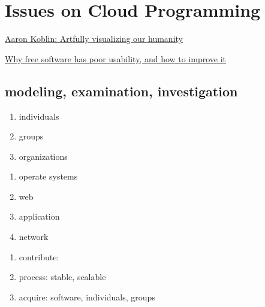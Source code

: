 \documentclass[draftclsnofoot,journal,onecolumn,12pt]{IEEEtran}
\begin{document}
\section{Issues on Cloud Programming}

\href{http://www.ted.com/talks/aaron_koblin.html}{Aaron Koblin: Artfully visualizing our humanity}

\href{http://www.mpt.net.nz/2012/06/why-free-software-has-poor-usability/}{Why free software has poor usability, and how to improve it}

\subsection{modeling, examination, investigation}

\begin{enumerate}
  \item individuals
  \item groups
  \item organizations
\end{enumerate}

\begin{enumerate}
  \item operate systems
  \item web
  \item application
  \item network
\end{enumerate}

\begin{enumerate}
  \item contribute:
  \item process: stable, scalable
  \item acquire: software, individuals, groups
\end{enumerate}


\nocite{Bonaccorsi20031243}
\nocite{chacon2009pro}
\nocite{Hertel20031159}
\nocite{kernighan1999practice}
\nocite{Kogut01062001}
\nocite{scacchi2006understanding}
\nocite{vonKrogh20031149}
\nocite{Yilmaz06techniquesand}

\renewcommand\refname{References}


\end{document}
